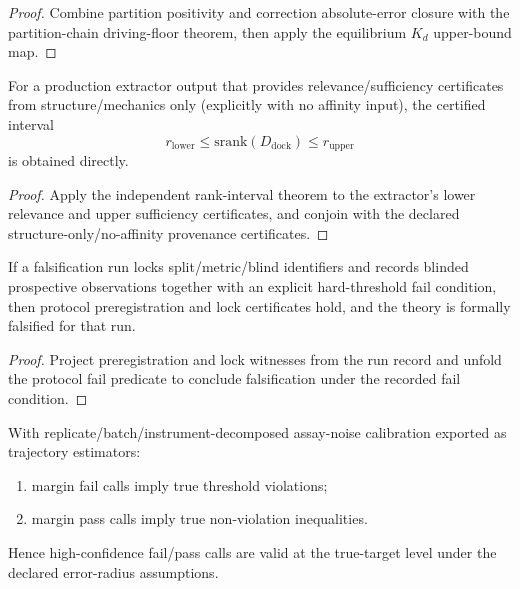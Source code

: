 \begin{proof}
Combine partition positivity and correction absolute-error closure with the partition-chain driving-floor theorem, then apply the equilibrium $K_d$ upper-bound map.
\end{proof}

\begin{theorem}\label{thm:production-independent-srank-extractor-bundle}
For a production extractor output that provides relevance/sufficiency certificates from structure/mechanics only (explicitly with no affinity input), the certified interval
\[
r_{\mathrm{lower}} \le \mathrm{srank}(D_{\mathrm{dock}}) \le r_{\mathrm{upper}}
\]
is obtained directly.
\end{theorem}

\begin{proof}
Apply the independent rank-interval theorem to the extractor's lower relevance and upper sufficiency certificates, and conjoin with the declared structure-only/no-affinity provenance certificates.
\end{proof}

\begin{theorem}\label{thm:locked-prospective-falsification-run-soundness}
If a falsification run locks split/metric/blind identifiers and records blinded prospective observations together with an explicit hard-threshold fail condition, then protocol preregistration and lock certificates hold, and the theory is formally falsified for that run.
\end{theorem}

\begin{proof}
Project preregistration and lock witnesses from the run record and unfold the protocol fail predicate to conclude falsification under the recorded fail condition.
\end{proof}

\begin{theorem}\label{thm:assay-noise-high-confidence-call-validity-bundle}
With replicate/batch/instrument-decomposed assay-noise calibration exported as trajectory estimators:
\begin{enumerate}
\item margin fail calls imply true threshold violations;
\item margin pass calls imply true non-violation inequalities.
\end{enumerate}
Hence high-confidence fail/pass calls are valid at the true-target level under the declared error-radius assumptions.
\end{theorem}

